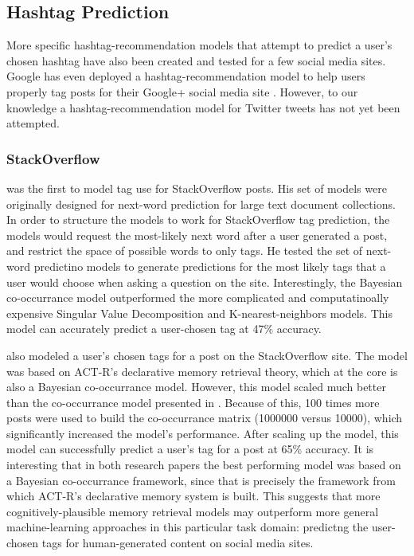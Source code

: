 \documentclass[man]{apa6}
\begin{document}
\subsection{Hashtag Prediction}

More specific hashtag-recommendation models that attempt to predict a user's chosen hashtag have also been created and tested for a few social media sites.
Google has even deployed a hashtag-recommendation model to help users properly tag posts for their Google+ social media site \parencite{GoogleKeynote2013}.
However, to our knowledge a hashtag-recommendation model for Twitter tweets has not yet been attempted.

\subsubsection{StackOverflow}

\textcite{Kuo2011} was the first to model tag use for StackOverflow posts.
His set of models were originally designed for next-word prediction for large text document collections.
In order to structure the models to work for StackOverflow tag prediction, the models would request the most-likely next word after a user generated a post, and restrict the space of possible words to only tags.
He tested the set of next-word predictino models to generate predictions for the most likely tags that a user would choose when asking a question on the site.
Interestingly, the Bayesian co-occurrance model outperformed the more complicated and computatinoally expensive Singular Value Decomposition and K-nearest-neighbors models.
This model can accurately predict a user-chosen tag at 47\% accuracy.

\textcite{Stanley2013} also modeled a user's chosen tags for a post on the StackOverflow site.
The model was based on ACT-R's declarative memory retrieval theory, which at the core is also a Bayesian co-occurrance model.
However, this model scaled much better than the co-occurrance model presented in \textcite{Kuo2011}.
Because of this, 100 times more posts were used to build the co-occurrance matrix (\num{1000000} versus \num{10000}), which significantly increased the model's performance.
After scaling up the model, this model can successfully predict a user's tag for a post at 65\% accuracy.
It is interesting that in both research papers the best performing model was based on a Bayesian co-occurrance framework, since that is precisely the framework from which ACT-R's declarative memory system is built.
This suggests that more cognitively-plausible memory retrieval models may outperform more general machine-learning approaches in this particular task domain:
predictng the user-chosen tags for human-generated content on social media sites.
\end{document}
